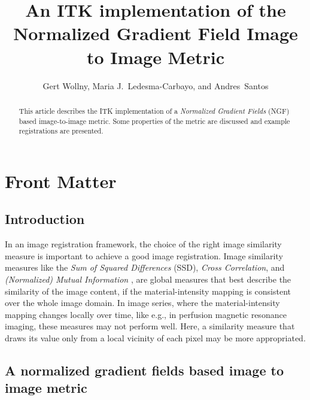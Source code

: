 \documentclass{InsightArticle}
\title{An ITK implementation of the Normalized Gradient Field Image to Image Metric}
\author{Gert Wollny, Maria J.~Ledesma-Carbayo, and Andres~Santos}
\newcommand{\IJhandlerIDnumber}{3150}
\begin{document}
%
% 
\IJhandlefooter{\IJhandlerIDnumber}

\maketitle


\ifhtml
\chapter*{Front Matter\label{front}}
\fi


\begin{abstract}
\noindent
This article describes the ITK implementation of a \emph{Normalized Gradient Fields} (NGF) based 
  image-to-image metric.
Some properties of the metric are discussed and example registrations are presented.
\end{abstract}

\IJhandlenote{\IJhandlerIDnumber}

\tableofcontents


\section{Introduction}

In an image registration framework, the choice of the right image similarity measure is important 
  to achieve a good image registration. 
Image similarity measures like the \emph{Sum of Squared Differences} (SSD), \emph{Cross Correlation}, and 
  \emph{(Normalized) Mutual Information} \cite{Maes97,Viola1997}, 
  are global measures that best describe the similarity of the image content, 
  if the material-intensity mapping is consistent over the whole image domain.
In image series, where the material-intensity mapping changes locally over time, like e.g., in perfusion 
  magnetic resonance imaging, these measures may not perform well.
Here, a similarity measure that draws its value only from a local vicinity of each pixel may 
  be more appropriated.

\section{A normalized gradient fields based image to image metric}
\label{sec:ngfmath}
\end{document}
